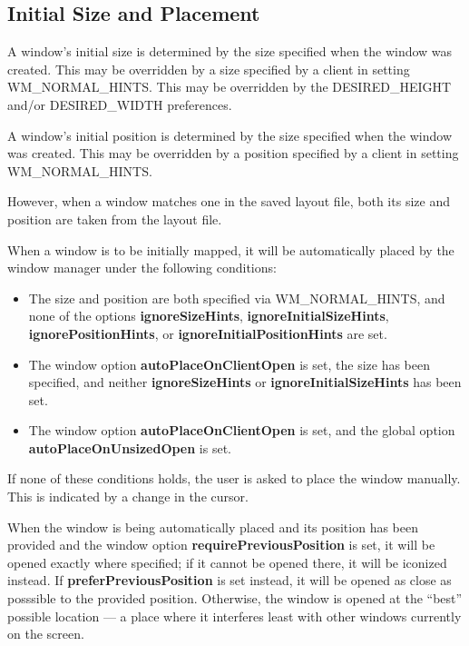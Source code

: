 \subsection{Initial Size and Placement}

A window's initial size is determined by the size specified
when the window was created.
This may be overridden by a size specified by a client in setting
{\sc WM\_NORMAL\_HINTS}.
This may be overridden by the
{\sc DESIRED\_HEIGHT} and/or {\sc DESIRED\_WIDTH} preferences.

A window's initial position is determined by the size specified
when the window was created.
This may be overridden by a position specified by a client in setting
{\sc WM\_NORMAL\_HINTS}.

However, when a window matches one in the saved layout file,
both its size and position are taken from the layout
file.

When a window is to be initially mapped, it will be automatically placed
by the window manager under the following conditions:
\begin{itemize}
\item The size and position are both specified via {\sc WM\_NORMAL\_HINTS},
and none of the options {\bf ignoreSizeHints}, {\bf ignoreInitialSizeHints},
{\bf ignorePositionHints}, or {\bf ignoreInitialPositionHints} are set.

\item The window option {\bf autoPlaceOnClientOpen} is set, the size has
been specified, and neither {\bf ignoreSizeHints} or
{\bf ignoreInitialSizeHints} has been set.

\item The window option {\bf autoPlaceOnClientOpen} is set, and the global
option {\bf autoPlaceOnUnsizedOpen} is set.
\end{itemize}

If none of these conditions holds, the user is asked to place the window
manually.  This is indicated by a change in the cursor.

When the window is being automatically placed and its position has
been provided and the window option
{\bf requirePreviousPosition} is set, it will be opened exactly where
specified;  if it cannot be opened there, it will be iconized instead.
If {\bf preferPreviousPosition} is set instead, it will be opened as
close as posssible to the provided position.
Otherwise, the window is opened at the ``best'' possible location --- a
place where it interferes least with other windows currently on the
screen.

